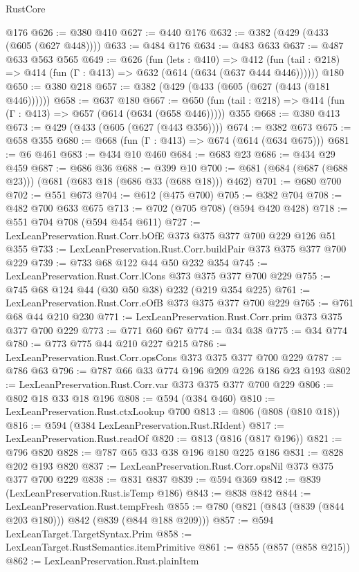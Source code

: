 \begin{lexlean}{RustCore}
\begin{coremodule}
    @176
@626 := @380 @410
@627 := @440 @176
@632 := @382 (@429 (@433 (@605 (@627 @448))))
@633 := @484 @176
@634 := @483 @633
@637 := @487 @633 @563 @565
@649 := @626
    (fun (lets : @410) =>
    @412 (fun (tail : @218) => @414 (fun (Γ : @413) => @632 (@614 (@634 (@637 @444 @446))))))
    @180
@650 := @380 @218
@657 := @382 (@429 (@433 (@605 (@627 (@443 (@181 @446))))))
@658 := @637 @180
@667 := @650 (fun (tail : @218) => @414 (fun (Γ : @413) => @657 (@614 (@634 (@658 @446))))) @355
@668 := @380 @413
@673 := @429 (@433 (@605 (@627 (@443 @356))))
@674 := @382 @673
@675 := @658 @355
@680 := @668 (fun (Γ : @413) => @674 (@614 (@634 @675)))
@681 := @6 @461
@683 := @434 @10 @460
@684 := @683 @23
@686 := @434 @29 @459
@687 := @686 @36
@688 := @399 @10
@700 := @681 (@684 (@687 (@688 @23))) (@681 (@683 @18 (@686 @33 (@688 @18))) @462)
@701 := @680 @700
@702 := @551 @673
@704 := @612 (@475 @700)
@705 := @382 @704
@708 := @482 @700 @633 @675
@713 := @702 (@705 @708) (@594 @420 @428)
@718 := @551 @704 @708 (@594 @454 @611)
@727 := LexLeanPreservation.Rust.Corr.bOfE @373 @375 @377 @700 @229 @126 @51 @355
@733 := LexLeanPreservation.Rust.Corr.buildPair @373 @375 @377 @700 @229
@739 := @733 @68 @122 @44 @50 @232 @354
@745 := LexLeanPreservation.Rust.Corr.lCons @373 @375 @377 @700 @229
@755 := @745 @68 @124 @44 (@30 @50 @38) @232 (@219 @354 @225)
@761 := LexLeanPreservation.Rust.Corr.eOfB @373 @375 @377 @700 @229
@765 := @761 @68 @44 @210 @230
@771 := LexLeanPreservation.Rust.Corr.prim @373 @375 @377 @700 @229
@773 := @771 @60 @67
@774 := @34 @38
@775 := @34 @774
@780 := @773 @775 @44 @210 @227 @215
@786 := LexLeanPreservation.Rust.Corr.opsCons @373 @375 @377 @700 @229
@787 := @786 @63
@796 := @787 @66 @33 @774 @196 @209 @226 @186 @23 @193
@802 := LexLeanPreservation.Rust.Corr.var @373 @375 @377 @700 @229
@806 := @802 @18 @33 @18 @196
@808 := @594 (@384 @460)
@810 := LexLeanPreservation.Rust.ctxLookup @700
@813 := @806 (@808 (@810 @18))
@816 := @594 (@384 LexLeanPreservation.Rust.RIdent)
@817 := LexLeanPreservation.Rust.readOf
@820 := @813 (@816 (@817 @196))
@821 := @796 @820
@828 := @787 @65 @33 @38 @196 @180 @225 @186
@831 := @828 @202 @193 @820
@837 := LexLeanPreservation.Rust.Corr.opsNil @373 @375 @377 @700 @229
@838 := @831 @837
@839 := @594 @369
@842 := @839 (LexLeanPreservation.Rust.isTemp @186)
@843 := @838 @842
@844 := LexLeanPreservation.Rust.tempFresh
@855 := @780 (@821 (@843 (@839 (@844 @203 @180))) @842 (@839 (@844 @188 @209)))
@857 := @594 LexLeanTarget.TargetSyntax.Prim
@858 := LexLeanTarget.RustSemantics.itemPrimitive
@861 := @855 (@857 (@858 @215))
@862 := LexLeanPreservation.Rust.plainItem

\end{coremodule}
\end{lexlean}
